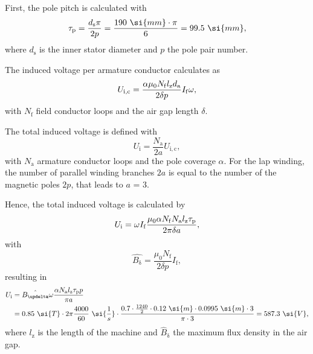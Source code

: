 \begin{solutionblock}
    First, the pole pitch is calculated with
    \begin{equation}
        \taup = \frac{d_{\mathrm{s}} \pi}{2 p}
        = \frac{190 \ \si{mm} \cdot \pi}{6}
        = 99.5 \ \si{mm},
    \end{equation}
    where $d_{\mathrm{s}}$ is the inner stator diameter and $p$ the pole pair number.

    The induced voltage per armature conductor calculates as
    \begin{equation}
        U_{\mathrm{i,c}} = \frac{\alpha\mu_{\mathrm{0}} N_{\mathrm{f}} l_{\mathrm{z}} d_{\mathrm{a}}}{2 \delta p} I_{\mathrm{f}} \omega,
    \end{equation}
    with $N_{\mathrm{f}}$ field conductor loops and the air gap length $\delta$.

    The total induced voltage is defined with
    \begin{equation}
        U_{\mathrm{i}} = \frac{N_{\mathrm{a}}}{2a} U_{\mathrm{i,c}},
    \end{equation}
    with $N_{\mathrm{a}}$ armature conductor loops and the pole coverage $\alpha$.
    For the lap winding, the number of parallel winding branches $2a$ is equal to the number of the magnetic poles $2p$, that leads to $a$ = 3.
    
    Hence, the total induced voltage is calculated by
    \begin{equation}
        U_{\mathrm{i}} = \omega I_{\mathrm{f}} \frac{\mu_{\mathrm{0}} \alpha N_{\mathrm{f}} N_{\mathrm{a}} l_{\mathrm{z}} \tau_{\mathrm{p}}}{2 \pi \delta a},
    \end{equation}
    with
    \begin{equation}
        \hat{B_{\updelta}} = \frac{\mu_{\mathrm{0}} N_{\mathrm{f}}}{2 \delta p} I_{\mathrm{f}},
        \label{eq:B_hat_task1}
    \end{equation}
    resulting in
    \begin{align}
        \begin{split}
            U_{\mathrm{i}} &= \hat{B_{\updelta}} \omega \frac{\alpha N_{\mathrm{a}} \lz \taup p}{\pi a}\\
            &= 0.85 \ \si{T} \cdot 2\pi \frac{4000}{60} \ \si{\frac{1}{s}} \cdot \frac{0.7 \cdot \frac{1240}{2} \cdot 0.12 \ \si{m} \cdot 0.0995 \ \si{m} \cdot 3}{\pi \cdot 3}
            = 587.3 \ \si{V},
        \end{split}
    \end{align}
    where $l_{\mathrm{z}}$ is the length of the machine and $\hat{B}_{\updelta}$ the maximum flux density in the air gap.
    

\end{solutionblock}




